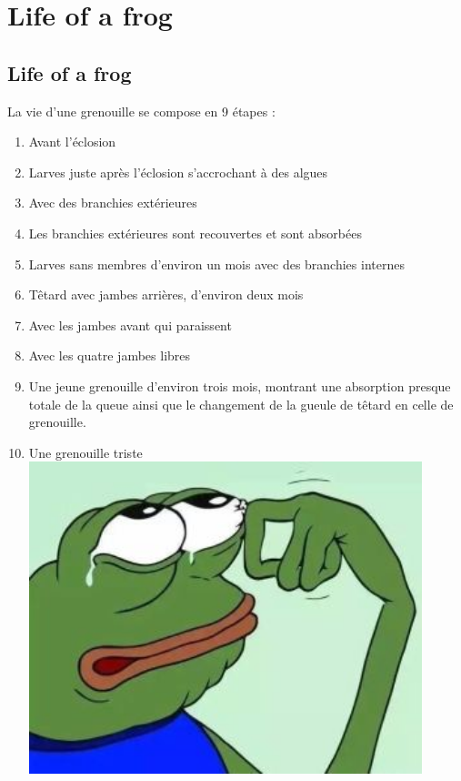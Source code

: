 \chapter{Life of a frog}
\section{Life of a frog}
La vie d'une grenouille se compose en 9 étapes :
	\begin{enumerate}
	\item Avant l'éclosion
	\item Larves juste après l'éclosion s'accrochant à des algues
	\item Avec des branchies extérieures
	\item Les branchies extérieures sont recouvertes et sont absorbées
	\item Larves sans membres d'environ un mois avec des branchies internes
	\item Têtard avec jambes arrières, d'environ deux mois
	\item Avec les jambes avant qui paraissent
	\item Avec les quatre jambes libres
	\item Une jeune grenouille d'environ trois mois, montrant une absorption presque totale de la queue ainsi que le changement de la gueule de têtard en celle de grenouille.
	\item Une grenouille triste
	\includegraphics[width=0.9\textwidth]{photos/frog.jpg}
	\end{enumerate}
	